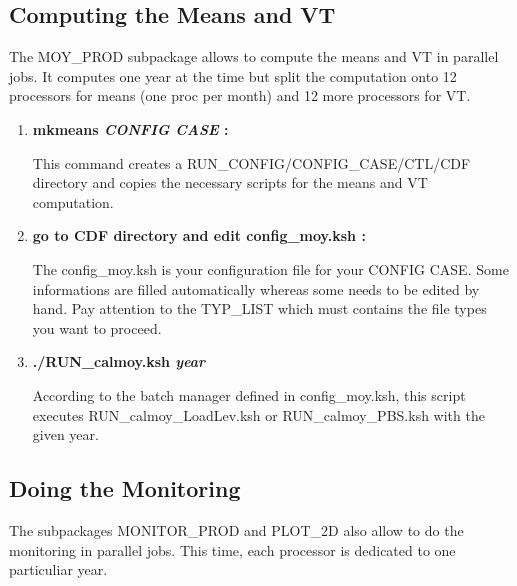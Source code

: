 \documentclass[a4paper,11pt]{article}
\begin{document}
\subsection{Computing the Means and VT}

The MOY\_PROD subpackage allows to compute the means and VT in parallel jobs. It computes one year
at the time but split the computation onto 12 processors for means (one proc per month) and 12 more
processors for VT.
\\[0.2cm]
\par


\begin{enumerate}
\item  \textbf{mkmeans \textit{CONFIG CASE} :}

This command creates a RUN\_CONFIG/CONFIG\_CASE/CTL/CDF directory and copies the necessary
scripts for the means and VT computation.

\item \textbf{go to CDF directory and edit config\_moy.ksh :}

The config\_moy.ksh is your configuration file for your CONFIG CASE. Some informations are
filled automatically whereas some needs to be edited by hand. Pay attention to the
TYP\_LIST which must contains the file types you want to proceed.

\item \textbf{./RUN\_calmoy.ksh \textit{year}}

According to the batch manager defined in config\_moy.ksh, this script executes
RUN\_calmoy\_LoadLev.ksh or RUN\_calmoy\_PBS.ksh with the given year.

\end{enumerate}

\subsection{Doing the Monitoring}

The subpackages MONITOR\_PROD and PLOT\_2D also allow to do the monitoring in parallel jobs.
This time, each processor is dedicated to one particuliar year.
\\[0.2cm]
\par
\end{document}
